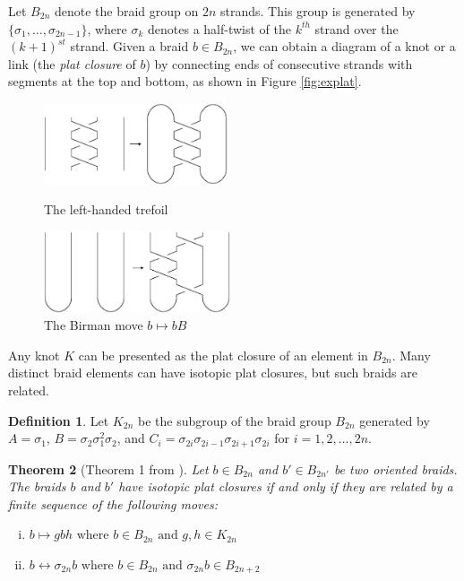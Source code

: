 \documentclass[11pt]{article}
\theoremstyle{plain} \newtheorem{thm}{Theorem}[subsection]
\theoremstyle{plain} \newtheorem{cor}[thm]{Corollary}
\theoremstyle{plain} \newtheorem{prop}[thm]{Proposition}
\theoremstyle{plain} \newtheorem{conj}[thm]{Conjecture}
\theoremstyle{plain} \newtheorem{lem}[thm]{Lemma}
\theoremstyle{definition} \newtheorem{df}[thm]{Definition}
\theoremstyle{remark} \newtheorem{rmk}[thm]{Remark}
\theoremstyle{remark} \newtheorem{obs}[thm]{Observation}
\newcommand{\Bn}{B_{2n}}
\newcommand{\Kn}{K_{2n}}
\newcommand{\B}[1]{B_{#1} }
\newcommand{\K}[1]{K_{#1} }
\newcommand{\gena}{\sigma_{1}}
\newcommand{\genb}{\sigma_{2}\sigma_{1}^{2}\sigma_{2}}
\newcommand{\genc}{\sigma_{2i}\sigma_{2i-1}\sigma_{2i+1}\sigma_{2i}}
\begin{document}
Let $\Bn$ denote the braid group on $2n$ strands.  This group is generated by $\{ \sigma_{1} , \ldots, \sigma_{2n-1}\}$, where $\sigma_{k}$ denotes a half-twist of the $k^{th}$ strand over the $(k+1)^{st}$ strand.  Given a braid $b \in \Bn$, we can obtain a diagram of a knot or a link (the \textit{plat closure} of $b$) by connecting ends of consecutive strands with segments at the top and bottom, as shown in Figure \ref{fig:explat}.

\begin{figure}[h!]
\centering
\begin{minipage}[c]{.47\linewidth}
\centering\includegraphics[height = 24mm]{ExPlat}
\caption{The left-handed trefoil}\label{fig:explat}
\end{minipage}
\begin{minipage}[c]{.52\linewidth}
\centering\includegraphics[height = 24mm]{BirmanMove}
\caption{The Birman move $b \mapsto b B$}\label{fig:birman}
\end{minipage}
\end{figure}

Any knot $K$ can be presented as the plat closure of an element in  $\Bn$.  Many distinct braid elements can have isotopic plat closures, but such braids are related.

\begin{df}
Let $\Kn$ be the subgroup of the braid group $\Bn$ generated by $A = \gena$, $B = \genb$, and $C_{i} = \genc$ for $i=1,2, \ldots ,2n$.
\end{df}

\begin{thm}[Theorem 1 from \cite{bir:moves}]\label{thm:birman}
Let $b \in \B{2n}$ and $b' \in \B{2n'}$ be two oriented braids.  The braids $b$ and $b'$ have isotopic plat closures if and only if they are related by a finite sequence of the following moves:
\begin{enumerate}[(i)]
  \item $b \mapsto g b h \text{ where } b \in \B{2n} \text{ and } g, h \in \K{2n}$
  \item $b \leftrightarrow \sigma_{2n} b \text{ where } b \in \B{2n} \text{ and } \sigma_{2n} b \in \B{2n+2}$
\end{enumerate}
\end{thm}
\end{document}
